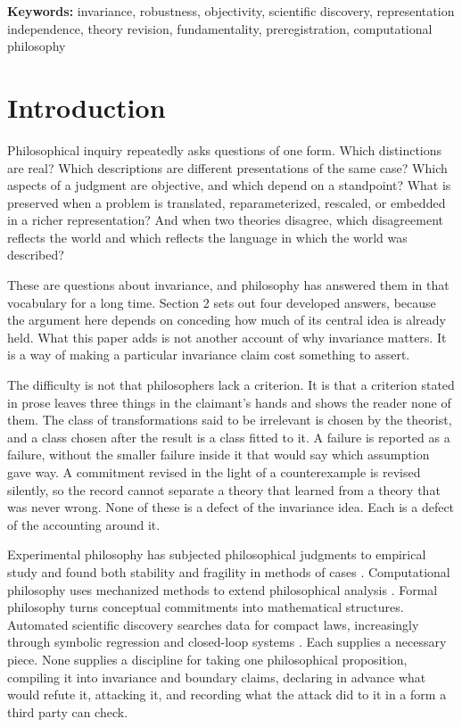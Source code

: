 \documentclass[11pt]{article}
\theoremstyle{remark}
\begin{document}
\noindent\textbf{Keywords:} invariance, robustness, objectivity, scientific
discovery, representation independence, theory revision, fundamentality,
preregistration, computational philosophy

\section{Introduction}

Philosophical inquiry repeatedly asks questions of one form. Which distinctions
are real? Which descriptions are different presentations of the same case? Which
aspects of a judgment are objective, and which depend on a standpoint? What is
preserved when a problem is translated, reparameterized, rescaled, or embedded in
a richer representation? And when two theories disagree, which disagreement
reflects the world and which reflects the language in which the world was
described?

These are questions about invariance, and philosophy has answered them in that
vocabulary for a long time. Section 2 sets out four developed answers, because the
argument here depends on conceding how much of its central idea is already held.
What this paper adds is not another account of why invariance matters. It is a way
of making a particular invariance claim cost something to assert.

The difficulty is not that philosophers lack a criterion. It is that a criterion
stated in prose leaves three things in the claimant's hands and shows the reader
none of them. The class of transformations said to be irrelevant is chosen by the
theorist, and a class chosen after the result is a class fitted to it. A failure is
reported as a failure, without the smaller failure inside it that would say which
assumption gave way. A commitment revised in the light of a counterexample is
revised silently, so the record cannot separate a theory that learned from a theory
that was never wrong. None of these is a defect of the invariance idea. Each is a
defect of the accounting around it.

Experimental philosophy has subjected philosophical judgments to empirical study
and found both stability and fragility in methods of cases
\citep{knobe2024,irikefe2025}. Computational philosophy uses mechanized methods to
extend philosophical analysis \citep{thagard2024}. Formal philosophy turns
conceptual commitments into mathematical structures. Automated scientific discovery
searches data for compact laws, increasingly through symbolic regression and
closed-loop systems \citep{makke2024,kramer2026}. Each supplies a necessary piece.
None supplies a discipline for taking one philosophical proposition, compiling it
into invariance and boundary claims, declaring in advance what would refute it,
attacking it, and recording what the attack did to it in a form a third party can
check.
\end{document}
